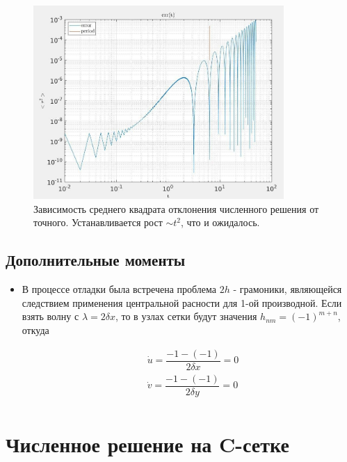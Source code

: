 \documentclass[a4paper,12pt]{article} %
\begin{document}
\begin{figure}[h!]
\begin{center}
\includegraphics[width=0.85\textwidth]{./pics/Atype_tErr}
\end{center}
\caption{Зависимость среднего квадрата отклонения численного решения от точного. Устанавливается рост $\sim t^2$, что и ожидалось.} \label{img:Atype_tErr}
\end{figure}

\subsection{Дополнительные моменты}

\begin{itemize}
\item В процессе отладки была встречена проблема $2h$ - грамоники, являющейся следствием применения центральной расности для 1-ой производной. Если взять волну с $\lambda = 2 \delta x$, то в узлах сетки будут значения $h_{nm} = (-1)^{m+n}$, откуда 

\begin{equation}
\begin{aligned}
& \dot{u} = \dfrac{-1 - (-1)}{2 \delta x} = 0 \\
& \dot{v} = \dfrac{-1 - (-1)}{2 \delta y} = 0 \\
\end{aligned}
\end{equation}

\end{itemize}

\newpage

\section{Численное решение на C-сетке}
\end{document}
